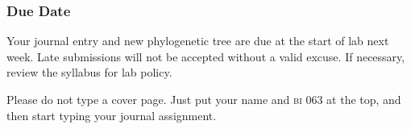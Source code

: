 \documentclass[12pt]{exam}
\begin{document}
\subsubsection*{Due Date} 

Your journal entry and new phylogenetic tree are due at the start of lab next week. Late submissions will not be accepted without a valid excuse. If necessary, review the syllabus for lab policy.

Please do not type a cover page. Just put your name and \textsc{bi} 063 at the
top, and then start typing your journal assignment.
\end{document}
